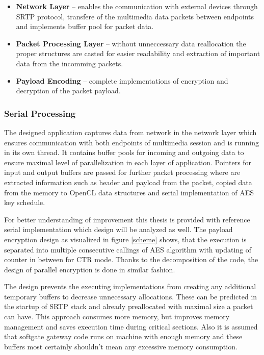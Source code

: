 \begin{itemize}
\item \textbf{Network Layer} -- enables the communication with external devices
through SRTP protocol, transfere of the multimedia data packets between endpoints
and implements buffer pool for packet data.  
\item \textbf{Packet Processing Layer} -- without unneccessary data reallocation
the proper structures are casted for easier readability and extraction of important
data from the incomming packets. 
\item \textbf{Payload Encoding} -- complete implementations of encryption and 
decryption of the packet payload.
\end{itemize}

\subsubsection*{Serial Processing}
The designed application captures data from network in the network layer which
ensures communication with both endpoints of multimedia session and is running 
in its own thread. It contains buffer pools for incoming and outgoing data to 
ensure maximal level of parallelization in each layer of application. Pointers 
for input and output buffers are passed for further packet processing where are 
extracted information such as header and payload from the packet, copied data 
from the memory to OpenCL data structures and serial implementation of AES key 
schedule. 

For better understanding of improvement this thesis is provided with reference
serial implementation which design will be analyzed as well. The payload 
encryption design as visualized in figure \ref{scheme} shows, that the execution
is separated into multiple consecutive callings of AES algorithm with updating
of counter in between for CTR mode. Thanks to the decomposition of the code,
the design of parallel encryption is done in similar fashion.

The design prevents the executing implementations from creating any additional
temporary buffers to decrease unnecessary allocations. These can be predicted in
the startup of SRTP stack and already preallocated with maximal size a packet
can have. This approach consumes more memory, but improves memory management and
saves execution time during critical sections. Also it is assumed that softgate
gateway code runs on machine with enough memory and these buffers most certainly
shouldn't mean any excessive memory consumption. 

